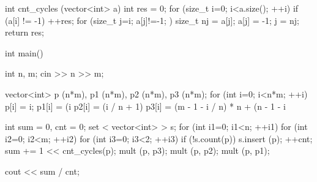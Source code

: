 int cnt_cycles (vector<int> a) {
	int res = 0;
	for (size_t i=0; i<a.size(); ++i)
		if (a[i] != -1) {
			++res;
			for (size_t j=i; a[j]!=-1; ) {
				size_t nj = a[j];
				a[j] = -1;
				j = nj;
			}
		}
	return res;
}

int main() {
	int n, m;
	cin >> n >> m;

	vector<int> p (n*m),  p1 (n*m),  p2 (n*m),  p3 (n*m);
	for (int i=0; i<n*m; ++i) {
		p[i] = i;
		p1[i] = (i %
		p2[i] = (i / n + 1) %
		p3[i] = (m - 1 - i / n) * n + (n - 1 - i %
	}

	int sum = 0,  cnt = 0;
	set < vector<int> > s;
	for (int i1=0; i1<n; ++i1) {
		for (int i2=0; i2<m; ++i2) {
			for (int i3=0; i3<2; ++i3) {
				if (!s.count(p)) {
					s.insert (p);
					++cnt;
					sum += 1 << cnt_cycles(p);
				}
				mult (p, p3);
			}
			mult (p, p2);
		}
		mult (p, p1);
	}
	
	cout << sum / cnt;
}
\endcode